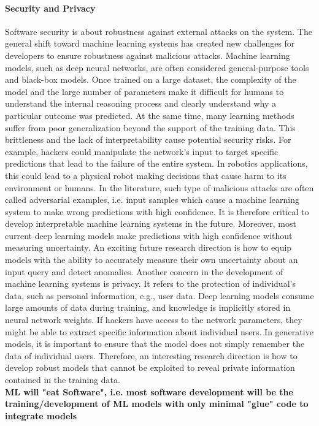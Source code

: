 \documentclass[11pt]{article}
\begin{document}
\paragraph{Security and Privacy} Software security is about robustness against external attacks on the system. The general shift toward machine learning systems has created new challenges for developers to ensure robustness against malicious attacks. Machine learning models, such as deep neural networks, are often considered general-purpose tools and black-box models. Once trained on a large dataset, the complexity of the model and the large number of parameters make it difficult for humans to understand the internal reasoning process and clearly understand why a particular outcome was predicted. At the same time, many learning methods suffer from poor generalization beyond the support of the training data. This brittleness and the lack of interpretability cause potential security risks. For example, hackers could manipulate the network's input to target specific predictions that lead to the failure of the entire system. In robotics applications, this could lead to a physical robot making decisions that cause harm to its environment or humans. In the literature, such type of malicious attacks are often called adversarial examples, i.e. input samples which cause a machine learning system to make wrong predictions with high confidence.  It is therefore critical to develop interpretable machine learning systems in the future. Moreover, most current deep learning models make predictions with high confidence without measuring uncertainty. An exciting future research direction is how to equip models with the ability to accurately measure their own uncertainty about an input query and detect anomalies. Another concern in the development of machine learning systems is privacy. It refers to the protection of individual's data, such as personal information, e.g., user data. Deep learning models consume large amounts of data during training, and knowledge is implicitly stored in neural network weights. If hackers have access to the network parameters, they might be able to extract specific information about individual users. In generative models, it is important to ensure that the model does not simply remember the data of individual users. Therefore, an interesting research direction is how to develop robust models that cannot be exploited to reveal private information contained in the training data.\\

\noindent\textbf{ML will "eat Software", i.e. most software development will be the training/development of ML models with only minimal "glue" code to integrate models}\\
\end{document}

